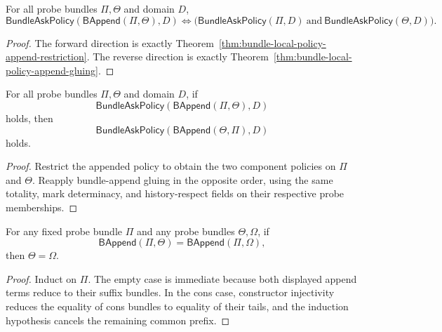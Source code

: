 \begin{theorem}
\label{thm:bundle-local-policy-append-iff}
For all probe bundles $\Pi,\Theta$ and domain $D$,
$$
\mathsf{BundleAskPolicy}(\mathsf{BAppend}(\Pi,\Theta),D)
\Longleftrightarrow
\bigl(\mathsf{BundleAskPolicy}(\Pi,D)\ \text{and}\ \mathsf{BundleAskPolicy}(\Theta,D)\bigr).
$$
\end{theorem}
\begin{proof}
The forward direction is exactly Theorem~\ref{thm:bundle-local-policy-append-restriction}. The reverse direction is exactly Theorem~\ref{thm:bundle-local-policy-append-gluing}.
\end{proof}

\begin{theorem}
\label{thm:bundle-ask-policy-append-comm}
For all probe bundles $\Pi,\Theta$ and domain $D$, if
$$
\mathsf{BundleAskPolicy}(\mathsf{BAppend}(\Pi,\Theta),D)
$$
holds, then
$$
\mathsf{BundleAskPolicy}(\mathsf{BAppend}(\Theta,\Pi),D)
$$
holds.
\end{theorem}
\begin{proof}
Restrict the appended policy to obtain the two component policies on $\Pi$
and $\Theta$. Reapply bundle-append gluing in the opposite order, using the
same totality, mark determinacy, and history-respect fields on their
respective probe memberships.
\end{proof}

\begin{theorem}
\label{thm:probe-bundle-prefix-cancellation}
For any fixed probe bundle $\Pi$ and any probe bundles $\Theta,\Omega$, if
$$
\mathsf{BAppend}(\Pi,\Theta)=\mathsf{BAppend}(\Pi,\Omega),
$$
then $\Theta=\Omega$.
\end{theorem}
\begin{proof}
Induct on $\Pi$. The empty case is immediate because both displayed append terms
reduce to their suffix bundles. In the cons case, constructor injectivity reduces
the equality of cons bundles to equality of their tails, and the induction
hypothesis cancels the remaining common prefix.
\end{proof}

